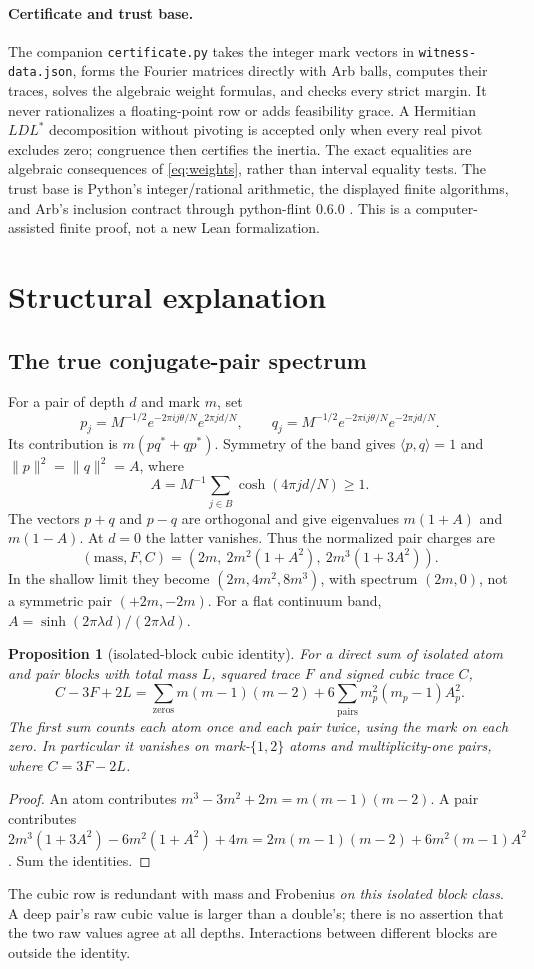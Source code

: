 \documentclass[11pt]{article}
\newtheorem{proposition}[theorem]{Proposition}
\theoremstyle{definition}\newtheorem{definition}[theorem]{Definition}
\theoremstyle{remark}\newtheorem{remark}[theorem]{Remark}
\begin{document}
\paragraph{Certificate and trust base.}
The companion \texttt{certificate.py} takes the integer mark vectors in
\texttt{witness-data.json}, forms the Fourier matrices directly with Arb
balls, computes their traces, solves the algebraic weight formulas, and
checks every strict margin. It never rationalizes a floating-point row or
adds feasibility grace. A Hermitian $LDL^*$ decomposition without pivoting
is accepted only when every real pivot excludes zero; congruence then
certifies the inertia. The exact equalities are algebraic consequences of
\eqref{eq:weights}, rather than interval equality tests. The trust base is
Python's integer/rational arithmetic, the displayed finite algorithms, and
Arb's inclusion contract through python-flint 0.6.0 \cite{Arb}.
This is a computer-assisted finite proof, not a new Lean formalization.

\section{Structural explanation}\label{sec:structure}
\subsection{The true conjugate-pair spectrum}
For a pair of depth $d$ and mark $m$, set
\[
p_j=M^{-1/2}e^{-2\pi ij\theta/N}e^{2\pi jd/N},\qquad
q_j=M^{-1/2}e^{-2\pi ij\theta/N}e^{-2\pi jd/N}.
\]
Its contribution is $m(pq^*+qp^*)$. Symmetry of the band gives
$\langle p,q\rangle=1$ and $\|p\|^2=\|q\|^2=A$, where
\[
 A=M^{-1}\sum_{j\in B}\cosh(4\pi jd/N)\ge1.
\]
The vectors $p+q$ and $p-q$ are orthogonal and give eigenvalues
$m(1+A)$ and $m(1-A)$. At $d=0$ the latter vanishes. Thus the normalized
pair charges are
\[
 (\mathrm{mass},F,C)=
 (2m,\ 2m^2(1+A^2),\ 2m^3(1+3A^2)).
\]
In the shallow limit they become $(2m,4m^2,8m^3)$, with spectrum $(2m,0)$,
not a symmetric pair $(+2m,-2m)$. For a flat continuum band,
$A=\sinh(2\pi\lambda d)/(2\pi\lambda d)$.

\begin{proposition}[isolated-block cubic identity]\label{prop:cubic}
For a direct sum of isolated atom and pair blocks with total mass $L$, squared
trace $F$ and signed cubic trace $C$,
\[
 C-3F+2L=\sum_{\mathrm{zeros}}m(m-1)(m-2)
        +6\sum_{\mathrm{pairs}}m_p^2(m_p-1)A_p^2.
\]
The first sum counts each atom once and each pair twice, using the mark on
each zero. In particular it vanishes on mark-$\{1,2\}$ atoms and
multiplicity-one pairs, where $C=3F-2L$.
\end{proposition}
\begin{proof}
An atom contributes $m^3-3m^2+2m=m(m-1)(m-2)$. A pair contributes
$2m^3(1+3A^2)-6m^2(1+A^2)+4m
=2m(m-1)(m-2)+6m^2(m-1)A^2$. Sum the identities.
\end{proof}
The cubic row is redundant with mass and Frobenius \emph{on this isolated
block class}. A deep pair's raw cubic value is larger than a double's;
there is no assertion that the two raw values agree at all depths.
Interactions between different blocks are outside the identity.
\end{document}
